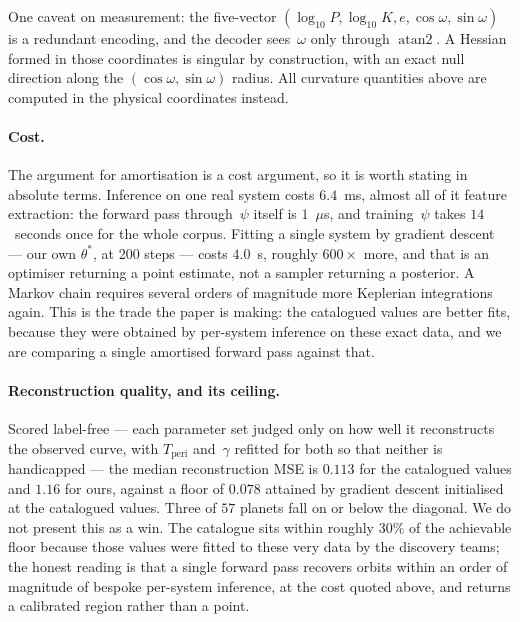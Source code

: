 One caveat on measurement: the five-vector
$(\log_{10}P, \log_{10}K, e, \cos\omega, \sin\omega)$ is a redundant encoding,
and the decoder sees~$\omega$ only through $\operatorname{atan2}$.  A Hessian
formed in those coordinates is singular by construction, with an exact null
direction along the $(\cos\omega, \sin\omega)$ radius.  All curvature
quantities above are computed in the physical coordinates instead.

\paragraph{Cost.}
The argument for amortisation is a cost argument, so it is worth stating in
absolute terms.  Inference on one real system costs $6.4$~ms, almost all of it
feature extraction: the forward pass through~$\psi$ itself is $1$~$\mu$s, and
training~$\psi$ takes $14$~seconds once for the whole corpus.  Fitting a single
system by gradient descent --- our own $\theta^\ast$, at 200 steps --- costs
$4.0$~s, roughly $600\times$ more, and that is an optimiser returning a point
estimate, not a sampler returning a posterior.  A Markov chain requires several
orders of magnitude more Keplerian integrations again.  This is the trade the
paper is making: the catalogued values are better fits, because they were
obtained by per-system inference on these exact data, and we are comparing a
single amortised forward pass against that.

\paragraph{Reconstruction quality, and its ceiling.}
Scored label-free --- each parameter set judged only on how well it
reconstructs the observed curve, with $T_{\mathrm{peri}}$ and~$\gamma$ refitted
for both so that neither is handicapped --- the median reconstruction MSE is
$0.113$ for the catalogued values and $1.16$ for ours, against a floor of
$0.078$ attained by gradient descent initialised at the catalogued values.
Three of $57$ planets fall on or below the diagonal.  We do not present this as
a win.  The catalogue sits within roughly $30\%$ of the achievable floor
because those values were fitted to these very data by the discovery teams;
the honest reading is that a single forward pass recovers orbits within an
order of magnitude of bespoke per-system inference, at the cost quoted above,
and returns a calibrated region rather than a point.

